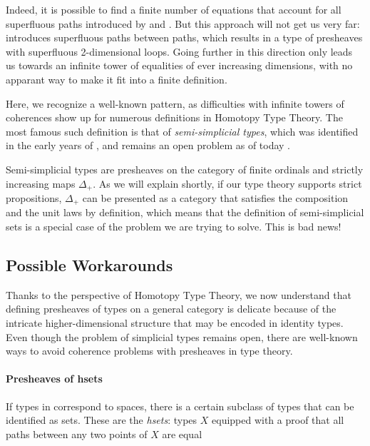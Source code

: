 Indeed, it is possible to find a finite number of equations that account for 
all superfluous paths introduced by  and .  
But this approach will not get us very far: 
% 
 introduces superfluous paths between paths, which results in
a type of presheaves with superfluous 2-dimensional loops.
% 
Going further in this direction only leads us towards an infinite tower 
of equalities of ever increasing dimensions, with no apparant way to make it 
fit into a finite definition.

Here, we recognize a well-known pattern, as difficulties with infinite 
towers of coherences show up for numerous definitions in Homotopy Type Theory.
% 
The most famous such definition is that of \emph{semi-simplicial types}, 
which was identified in the early years of \HoTT \cite{IAS2012semisimplicial}, 
and remains an open problem as of today .

Semi-simplicial types are presheaves on the category of finite ordinals and 
strictly increasing maps \( \Delta_+ \).
% 
As we will explain shortly, if our type theory supports strict propositions,
\( \Delta_+ \) can be presented as a category that satisfies the composition
and the unit laws by definition, which means that the definition of 
semi-simplicial sets is a special case of the problem we are trying to solve.
% 
This is bad news!

\subsection{Possible Workarounds}

Thanks to the perspective of Homotopy Type Theory, we now understand that
defining presheaves of types on a general category is delicate because of the 
intricate higher-dimensional structure that may be encoded in identity types.
% 
Even though the problem of simplicial types remains open, there are well-known 
ways to avoid coherence problems with presheaves in type theory.

\paragraph{Presheaves of hsets} If types in \HoTT correspond to spaces, there 
is a certain subclass of types that can be identified as sets.
% 
These are the \emph{hsets}: types \( X \) equipped with a proof that all 
paths between any two points of \( X \) are equal


